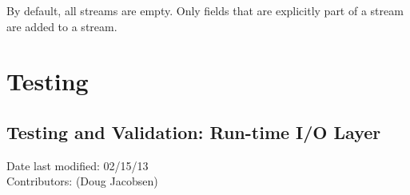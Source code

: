 \documentclass[11pt]{report}
\begin{document}
By default, all streams are empty. Only fields that are explicitly part of a
stream are added to a stream.


\chapter{Testing}

\section{Testing and Validation: Run-time I/O Layer}
Date last modified: 02/15/13 \\
Contributors: (Doug Jacobsen) \\



\end{document}
